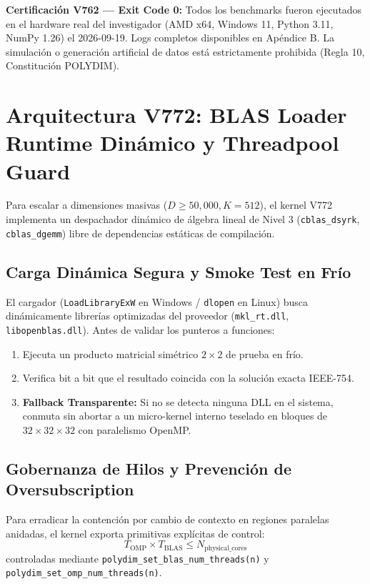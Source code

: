 \begin{certifiedbox}
\textbf{Certificación V762 --- Exit Code 0:}
Todos los benchmarks fueron ejecutados en el hardware real del investigador
(AMD x64, Windows 11, Python 3.11, NumPy 1.26) el 2026-09-19.
Logs completos disponibles en Apéndice B.
La simulación o generación artificial de datos está estrictamente prohibida
(Regla 10, Constitución POLYDIM).
\end{certifiedbox}

\section{Arquitectura V772: BLAS Loader Runtime Dinámico y Threadpool Guard}
\label{sec:blas_runtime_loader}

Para escalar a dimensiones masivas ($D \ge 50{,}000, K = 512$), el kernel V772 implementa un despachador dinámico de álgebra lineal de Nivel 3 (\texttt{cblas\_dsyrk}, \texttt{cblas\_dgemm}) libre de dependencias estáticas de compilación.

\subsection{Carga Dinámica Segura y Smoke Test en Frío}
El cargador (\texttt{LoadLibraryExW} en Windows / \texttt{dlopen} en Linux) busca dinámicamente librerías optimizadas del proveedor (\texttt{mkl\_rt.dll}, \texttt{libopenblas.dll}). Antes de validar los punteros a funciones:
\begin{enumerate}
    \item Ejecuta un producto matricial simétrico $2 \times 2$ de prueba en frío.
    \item Verifica bit a bit que el resultado coincida con la solución exacta IEEE-754.
    \item \textbf{Fallback Transparente:} Si no se detecta ninguna DLL en el sistema, conmuta sin abortar a un micro-kernel interno teselado en bloques de $32 \times 32 \times 32$ con paralelismo OpenMP.
\end{enumerate}

\subsection{Gobernanza de Hilos y Prevención de Oversubscription}
Para erradicar la contención por cambio de contexto en regiones paralelas anidadas, el kernel exporta primitivas explícitas de control:
\begin{equation}
T_{\text{OMP}} \times T_{\text{BLAS}} \le N_{\text{physical\_cores}}
\end{equation}
controladas mediante \texttt{polydim\_set\_blas\_num\_threads(n)} y \texttt{polydim\_set\_omp\_num\_threads(n)}.

